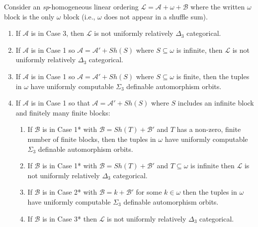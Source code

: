 \documentclass[11pt]{amsart}
\theoremstyle{definition}
\def\A{\mathcal A}
\def\B{\mathcal{B}}
\def\L{\mathcal L}
\begin{document}
\begin{proposition}\label{prop:omegaAnalysis}
    Consider an \textit{sp}-homogeneous linear ordering $\L=\A+\omega+\B$ where the written $\omega$ block is the only $\omega$ block (i.e., $\omega$ does not appear in a shuffle sum).
    \begin{enumerate}
        \item If $\A$ is in Case 3, then $\L$ is not uniformly relatively $\Delta_3$ categorical.
        \item If $\A$ is in Case 1 so $\A=\A'+Sh(S)$ where $S\subseteq\omega$ is infinite, then $\L$ is not uniformly relatively $\Delta_3$ categorical.
        \item If $\A$ is in Case 1 so $\A=\A'+Sh(S)$ where $S\subseteq\omega$ is finite, then the tuples in $\omega$ have uniformly computable $\Sigma_3$ definable automorphism orbits.
        \item If $\A$ is in Case 1 so that $\A=\A'+Sh(S)$ where $S$ includes an infinite block and finitely many finite blocks:
        \begin{enumerate}
            \item If $\B$ is in Case 1* with $\B=Sh(T)+\B'$ and $T$ has a non-zero, finite number of finite blocks, then the tuples in $\omega$ have uniformly computable $\Sigma_3$ definable automorphism orbits.
            \item If $\B$ is in Case 1* with $\B=Sh(T)+\B'$ and $T\subseteq \omega$ is infinite then $\L$ is not uniformly relatively $\Delta_3$ categorical.
            \item If $\B$ is in Case 2* with $\B=k+\B'$ for some $k\in\omega$ then the tuples in $\omega$ have uniformly computable $\Sigma_3$ definable automorphism orbits.
            \item If $\B$ is in Case 3* then $\L$ is not uniformly relatively $\Delta_3$ categorical.
        \end{enumerate}
    \end{enumerate}
\end{proposition}
\end{document}
